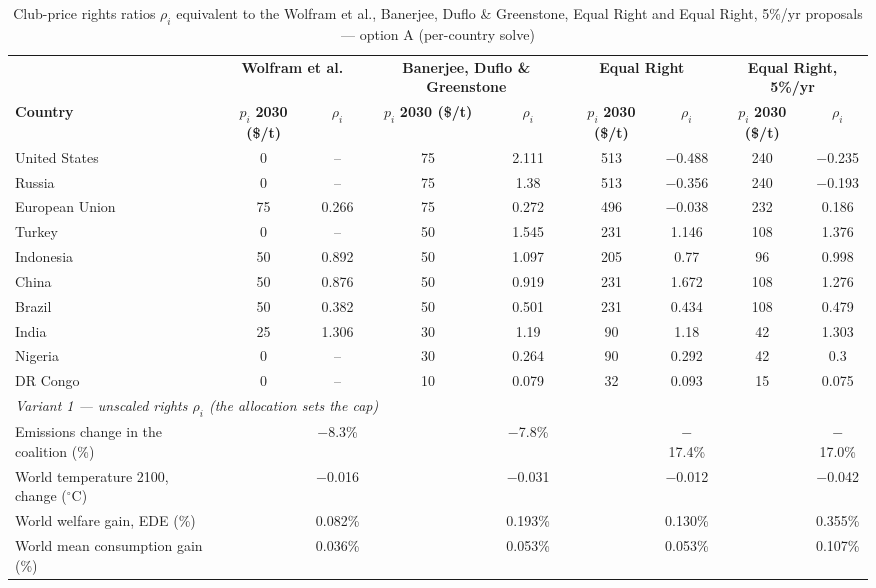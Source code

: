 \begin{table}[htbp]
\centering
\small
\caption{Club-price rights ratios $\rho_i$ equivalent to the Wolfram et al., Banerjee, Duflo \& Greenstone, Equal Right and Equal Right, 5\%/yr proposals --- option A (per-country solve)}
\renewcommand{\arraystretch}{1.15}
\begin{tabular}{lcccccccc}
  \toprule
  & \multicolumn{2}{c}{\textbf{Wolfram et al.}} & \multicolumn{2}{c}{\textbf{Banerjee, Duflo \& Greenstone}} & \multicolumn{2}{c}{\textbf{Equal Right}} & \multicolumn{2}{c}{\textbf{Equal Right, 5\%/yr}} \\
  \cmidrule(lr){2-3} \cmidrule(lr){4-5} \cmidrule(lr){6-7} \cmidrule(lr){8-9}
  \textbf{Country} & $p_i$ \textbf{2030 (\$/t)} & $\rho_i$ & $p_i$ \textbf{2030 (\$/t)} & $\rho_i$ & $p_i$ \textbf{2030 (\$/t)} & $\rho_i$ & $p_i$ \textbf{2030 (\$/t)} & $\rho_i$ \\
  \midrule
  United States & 0 & -- & 75 & 2.111 & 513 & $-$0.488 & 240 & $-$0.235 \\
  Russia & 0 & -- & 75 & 1.38 & 513 & $-$0.356 & 240 & $-$0.193 \\
  European Union & 75 & 0.266 & 75 & 0.272 & 496 & $-$0.038 & 232 & 0.186 \\
  Turkey & 0 & -- & 50 & 1.545 & 231 & 1.146 & 108 & 1.376 \\
  Indonesia & 50 & 0.892 & 50 & 1.097 & 205 & 0.77 & 96 & 0.998 \\
  China & 50 & 0.876 & 50 & 0.919 & 231 & 1.672 & 108 & 1.276 \\
  Brazil & 50 & 0.382 & 50 & 0.501 & 231 & 0.434 & 108 & 0.479 \\
  India & 25 & 1.306 & 30 & 1.19 & 90 & 1.18 & 42 & 1.303 \\
  Nigeria & 0 & -- & 30 & 0.264 & 90 & 0.292 & 42 & 0.3 \\
  DR Congo & 0 & -- & 10 & 0.079 & 32 & 0.093 & 15 & 0.075 \\
  \midrule
  \multicolumn{9}{l}{\textit{Variant 1 --- unscaled rights $\rho_i$ (the allocation sets the cap)}} \\
  \quad Emissions change in the coalition (\%) &  & $-$8.3\% &  & $-$7.8\% &  & $-$17.4\% &  & $-$17.0\% \\
  \quad World temperature 2100, change ($^\circ$C) &  & $-$0.016 &  & $-$0.031 &  & $-$0.012 &  & $-$0.042 \\
  \quad World welfare gain, EDE (\%) &  & 0.082\% &  & 0.193\% &  & 0.130\% &  & 0.355\% \\
  \quad World mean consumption gain (\%) &  & 0.036\% &  & 0.053\% &  & 0.053\% &  & 0.107\% \\

\end{tabular}
\end{table}
